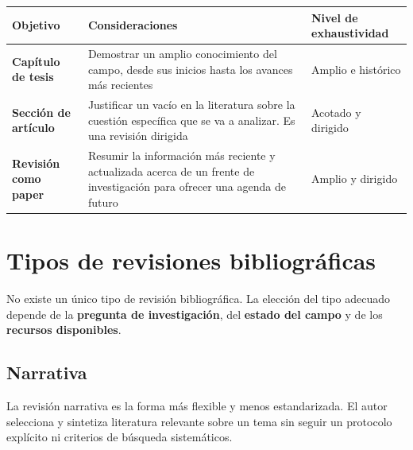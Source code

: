 \documentclass[
]{book}
\newcounter{none} %
\begin{document}
{\def\LTcaptype{none} %
\begin{longtable}[]{@{}
  >{\centering\arraybackslash}p{}
  >{\raggedright\arraybackslash}p{}
  >{\centering\arraybackslash}p{}@{}}
\toprule\noalign{}
\begin{minipage}[b]{\linewidth}\centering
Objetivo
\end{minipage} & \begin{minipage}[b]{\linewidth}\raggedright
Consideraciones
\end{minipage} & \begin{minipage}[b]{\linewidth}\centering
Nivel de exhaustividad
\end{minipage} \\
\midrule\noalign{}
\endhead
\bottomrule\noalign{}
\endlastfoot
\textbf{Capítulo de tesis} & Demostrar un amplio conocimiento del campo, desde sus inicios hasta los avances más recientes & Amplio e histórico \\
\textbf{Sección de artículo} & Justificar un vacío en la literatura sobre la cuestión específica que se va a analizar. Es una revisión dirigida & Acotado y dirigido \\
\textbf{Revisión como paper} & Resumir la información más reciente y actualizada acerca de un frente de investigación para ofrecer una agenda de futuro & Amplio y dirigido \\
\end{longtable}
}

\chapter{Tipos de revisiones bibliográficas}\label{tipos-de-revisiones-bibliogruxe1ficas}

No existe un único tipo de revisión bibliográfica. La elección del tipo adecuado depende de la \textbf{pregunta de investigación}, del \textbf{estado del campo} y de los \textbf{recursos disponibles}.

\section{Narrativa}\label{narrativa}

La revisión narrativa es la forma más flexible y menos estandarizada. El autor selecciona y sintetiza literatura relevante sobre un tema sin seguir un protocolo explícito ni criterios de búsqueda sistemáticos.
\end{document}

